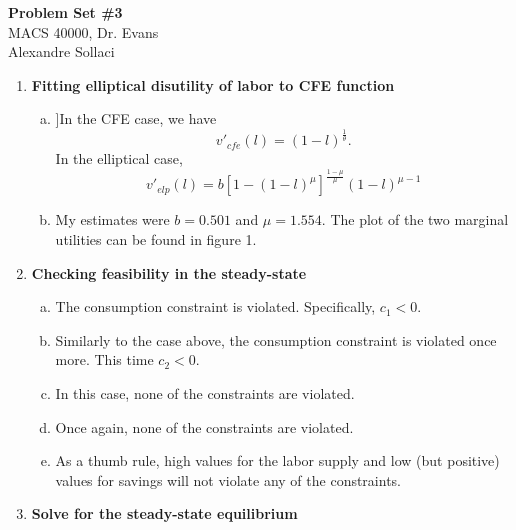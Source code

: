 \documentclass[letterpaper,12pt]{article}
\theoremstyle{definition}
\begin{document}
\begin{flushleft}
   \textbf{\large{Problem Set \#3}} \\
   MACS 40000, Dr. Evans \\
   Alexandre Sollaci
\end{flushleft}

\vspace{5mm}

\noindent\begin{enumerate}
   \item \textbf{Fitting elliptical disutility of labor to CFE function}
 	\begin{enumerate}[(a)]
 	\item ]In the CFE case, we have
 	\[ v'_{cfe}(l) = (1-l)^{\frac{1}{\theta}} .\]
 	In the elliptical case, 
 	\[ v'_{elp}(l) = b\left[1 - (1-l)^{\mu}\right]^{\frac{1-\mu}{\mu}} (1-l)^{\mu - 1}\]
 	\item My estimates were $b = 0.501$ and $\mu = 1.554$. The plot of the two marginal utilities can be found in figure 1.
 	\end{enumerate}
	
	\item \textbf{Checking feasibility in the steady-state}
	
	\begin{enumerate}[(a)]
	\item The consumption constraint is violated. Specifically, $c_1 < 0$.
	\item Similarly to the case above, the consumption constraint is violated once more. This time $c_2 < 0$.
	\item In this case, none of the constraints are violated.
	\item Once again, none of the constraints are violated.
	\item As a thumb rule, high values for the labor supply and low (but positive) values for savings will not violate any of the constraints.
	\end{enumerate}
	
	\item \textbf{Solve for the steady-state equilibrium}


\end{enumerate}
\end{document}
